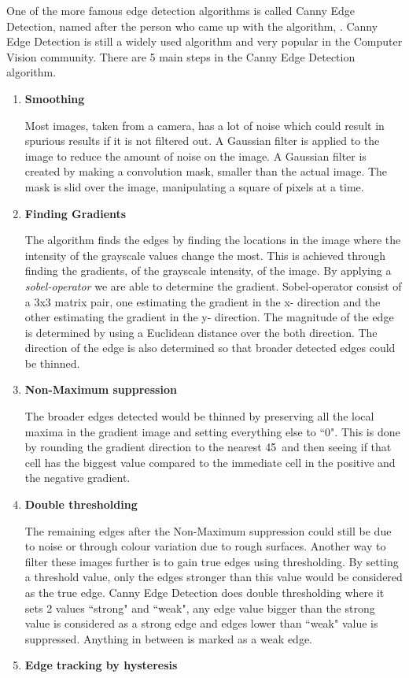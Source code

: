 One of the more famous edge detection algorithms is called Canny Edge Detection\cite{canny-paper}, named after the person who came up with the algorithm, \citeauthor{canny-paper}. Canny Edge Detection is still a widely used algorithm and very popular in the Computer Vision community. There are 5 main steps in the Canny Edge Detection algorithm\cite{canny-tutorial}.
\begin{enumerate}
\item \textbf{Smoothing}

Most images, taken from a camera, has a lot of noise which could result in spurious results if it is not filtered out. A Gaussian filter is applied to the image to reduce the amount of noise on the image. A Gaussian filter is created by making a convolution mask, smaller than the actual image. The mask is slid over the image, manipulating a square of pixels at a time\cite{canny-tutorial2}.
\item \textbf{Finding Gradients}

The algorithm finds the edges by finding the locations in the image where the intensity of the grayscale values change the most. This is achieved through finding the gradients, of the grayscale intensity, of the image. By applying a \emph{sobel-operator} we are able to determine the gradient\cite{sobel-operator}. Sobel-operator consist of a 3x3 matrix pair, one estimating the gradient in the x- direction and the other estimating the gradient in the y- direction. The magnitude of the edge is determined by using a Euclidean distance over the both direction. The direction of the edge is also determined so that broader detected edges could be thinned.
\item \textbf{Non-Maximum suppression}

The broader edges detected would be thinned by preserving all the local maxima in the gradient image and setting everything else to ``0". This is done by rounding the gradient direction to the nearest 45\textdegree \,  and then seeing if that cell has the biggest value compared to the immediate cell in the positive and the negative gradient. 
\item \textbf{Double thresholding}

The remaining edges after the Non-Maximum suppression could still be due to noise or through colour variation due to rough surfaces. Another way to filter these images further is to gain true edges using thresholding. By setting a threshold value, only the edges stronger than this value would be considered as the true edge. Canny Edge Detection does double thresholding where it sets 2 values ``strong" and ``weak", any edge value bigger than the strong value is considered as a strong edge and edges lower than ``weak"  value is suppressed. Anything in between is marked as a weak edge.
\item \textbf{Edge tracking by hysteresis}


\end{enumerate}
